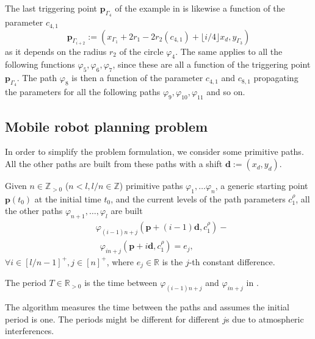 The last triggering point $\mathbf{p}_{\Gamma_4}$ of the example in  is likewise a function of the parameter $c_{4,1}$
\begin{equation}
  \mathbf{p}_{\Gamma_{i+2}}:=(x_{\Gamma_1}+2r_1-2r_2(c_{4,1})+\lfloor i/4\rfloor x_d,y_{\Gamma_3})
\end{equation}
as it depends on the radius $r_2$ of the circle $\varphi_4$. The same applies to all the following functions $\varphi_5,\varphi_6,\varphi_7$, since these are all a function of the triggering point $\mathbf{p}_{\Gamma_4}$. The path $\varphi_8$ is then a function of the parameter $c_{4,1}$ and $c_{8,1}$ propagating the parameters for all the following paths $\varphi_9,\varphi_{10},\varphi_{11}$ and so on.

\subsection{Mobile robot planning problem}
\label{sec:plan-pb}

In order to simplify the problem formulation, we consider some primitive paths. All the other paths are built from these paths with a shift $\mathbf{d}:=(x_d,y_d)$.

Given $n\in\mathbb{Z}_{>0}$ ($n<l,l/n\in\mathbb{Z}$) primitive paths $\varphi_1,\dots\varphi_n$, a generic starting point $\mathbf{p}(t_0)$ at the initial time $t_0$, and the current levels of the path parameters $c_1^\rho$, all the other paths $\varphi_{n+1},\dots,\varphi_l$ are built
\begin{equation}\label{eq:primitive}\begin{split}
  &\varphi_{(i-1)n+j}(\mathbf{p}+(i-1)\mathbf{d},c_1^\rho)-\\ &\,\,\,\varphi_{in+j}(\mathbf{p}+i\mathbf{d},c_1^\rho)=e_j,
\end{split}\end{equation}
$\forall i\in[l/n-1]^+,j\in[n]^+$, where $e_j\in\mathbb{R}$ is the $j$-th constant difference.

\begin{highlight}
\begin{defn}[Period]\label{def:period}
  The period $T\in\mathbb{R}_{> 0}$ is the time between $\varphi_{(i-1)n+j}$ and $\varphi_{in+j}$ in .
\end{defn} 
\end{highlight}

The algorithm measures the time between the paths and assumes the initial period is one. The periods might be different for different $j$s due to atmospheric interferences.

